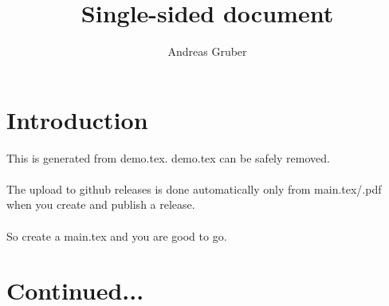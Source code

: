 \documentclass{article}
\begin{document}
\pagestyle{fancy}
\title{Single-sided document}
\author{Andreas Gruber}
\date{\docversion}
\fancyhf{} %
\fancyfoot[L]{\thepage}
\fancyfoot[C]{\docversion}
\maketitle
\section{Introduction}
This is generated from demo.tex. demo.tex can be safely removed.\\\\
The upload to github releases is done automatically only from main.tex/.pdf when you create and publish a release.\\\\
So create a main.tex and you are good to go.
\newpage
\section{Continued...}
\end{document}
